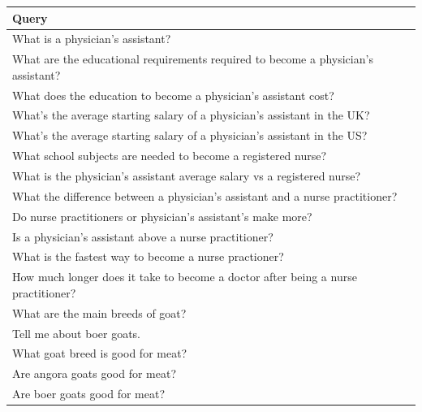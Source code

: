 \begin{table}[t]
    \small
    \begin{center}
        \begin{tabular}{l}
            \toprule
            Query                                                                             \\
            \midrule
            What is a physician's assistant?                                                  \\
            What are the educational requirements required to become a physician's assistant? \\
            What does the education to become a physician's assistant cost?                   \\
            What's the average starting salary of a physician's assistant in the UK?          \\
            What's the average starting salary of a physician's assistant in the US?          \\
            What school subjects are needed to become a registered nurse?                     \\
            What is the physician's assistant average salary vs a registered nurse?           \\
            What the difference between a physician's assistant and a nurse practitioner?     \\
            Do nurse practitioners or physician's assistant's make more?                      \\
            Is a physician's assistant above a nurse practitioner?                            \\
            What is the fastest way to become a nurse practioner?                             \\
            How much longer does it take to become a doctor after being a nurse practitioner? \\
            What are the main breeds of goat?                                                 \\
            Tell me about boer goats.                                                         \\
            What goat breed is good for meat?                                                 \\
            Are angora goats good for meat?                                                   \\
            Are boer goats good for meat?                                                     \\

\end{tabular}
\end{center}
\end{table}

